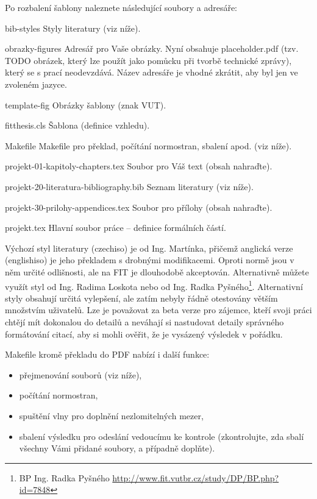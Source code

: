Po rozbalení šablony naleznete následující soubory a adresáře:
\begin{DESCRIPTION}
  \item [bib-styles] Styly literatury (viz níže). 
  \item [obrazky-figures] Adresář pro Vaše obrázky. Nyní obsahuje placeholder.pdf (tzv. TODO obrázek, který lze použít jako pomůcku při tvorbě technické zprávy), který se s prací neodevzdává. Název adresáře je vhodné zkrátit, aby byl jen ve zvoleném jazyce.
  \item [template-fig] Obrázky šablony (znak VUT).
  \item [fitthesis.cls] Šablona (definice vzhledu).
  \item [Makefile] Makefile pro překlad, počítání normostran, sbalení apod. (viz níže).
  \item [projekt-01-kapitoly-chapters.tex] Soubor pro Váš text (obsah nahraďte).
  \item [projekt-20-literatura-bibliography.bib] Seznam literatury (viz níže).
  \item [projekt-30-prilohy-appendices.tex] Soubor pro přílohy (obsah nahraďte).
  \item [projekt.tex] Hlavní soubor práce -- definice formálních částí.
\end{DESCRIPTION}

Výchozí styl literatury (czechiso) je od Ing. Martínka, přičemž anglická verze (englishiso) je jeho překladem s drobnými modifikacemi. Oproti normě jsou v něm určité odlišnosti, ale na FIT je dlouhodobě akceptován. Alternativně můžete využít styl od Ing. Radima Loskota nebo od Ing. Radka Pyšného\footnote{BP Ing. Radka Pyšného \url{http://www.fit.vutbr.cz/study/DP/BP.php?id=7848}}. Alternativní styly obsahují určitá vylepšení, ale zatím nebyly řádně otestovány větším množstvím uživatelů. Lze je považovat za beta verze pro zájemce, kteří svoji práci chtějí mít dokonalou do detailů a neváhají si nastudovat detaily správného formátování citací, aby si mohli ověřit, že je vysázený výsledek v pořádku.

Makefile kromě překladu do PDF nabízí i další funkce:
\begin{itemize}
  \item přejmenování souborů (viz níže),
  \item počítání normostran,
  \item spuštění vlny pro doplnění nezlomitelných mezer,
  \item sbalení výsledku pro odeslání vedoucímu ke kontrole (zkontrolujte, zda sbalí všechny Vámi přidané soubory, a případně doplňte).
\end{itemize}


